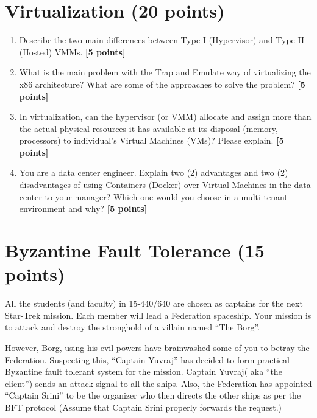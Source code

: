 \documentclass{article}
\begin{document}
\section{Virtualization (20 points)}
\begin{enumerate}
\item{  Describe the two main differences between Type I (Hypervisor) and Type II (Hosted) VMMs. \textbf{[5 points]}}

\item{ What is the main problem with the Trap and Emulate way of virtualizing the x86 architecture? What are some of the approaches to solve the problem? \textbf{[5 points]}}

\item{ In virtualization, can the hypervisor (or VMM) allocate and assign more than the actual physical resources it has available at its disposal (memory, processors) to individual's Virtual Machines (VMs)? Please explain. \textbf{[5 points]}}

\item{ You are a data center engineer. Explain two (2) advantages and two (2) disadvantages of using Containers (Docker) over Virtual Machines in the data center to your manager? Which one would you choose in a multi-tenant environment and why? \textbf{[5 points]}}
\end{enumerate}


\section{Byzantine Fault Tolerance (15 points)}
All the students (and faculty) in 15-440/640 are chosen as captains for the next Star-Trek mission. Each member will lead a Federation spaceship. Your mission is to attack and destroy the stronghold of a villain named ``The Borg''.

However, Borg, using his evil powers have brainwashed some of you to betray the Federation. Suspecting this, ``Captain Yuvraj'' has decided to form practical Byzantine fault tolerant system for the mission. Captain Yuvraj( aka ``the client'') sends an attack signal to all the ships. Also, the Federation has appointed ``Captain Srini'' to be the organizer who then directs the other ships as per the BFT protocol (Assume that Captain Srini properly forwards the request.)
\end{document}
